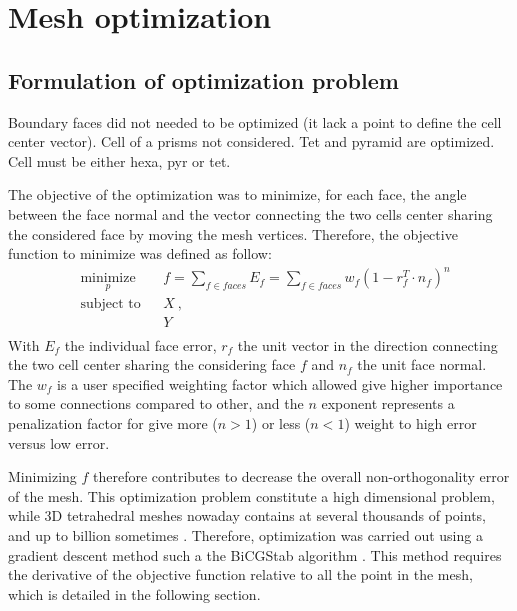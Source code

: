 \documentclass[11pt]{article}
\begin{document}
\section{Mesh optimization}


\subsection{Formulation of optimization problem}

Boundary faces did not needed to be optimized (it lack a point to define the cell center vector).
Cell of a prisms not considered. Tet and pyramid are optimized. Cell must be either hexa, pyr or tet.

The objective of the optimization was to minimize, for each face, the angle between the face normal and the vector connecting the two cells center sharing the considered face by moving the mesh vertices. 
Therefore, the objective function to minimize was defined as follow:
%
\begin{equation}
\begin{aligned}
& \underset{p}{\text{minimize}}
& & f = \sum_{f \in faces} E_f = \sum_{f \in faces} w_f \left( 1 - r_f^T \cdot n_f \right) ^n  \\
& \text{subject to}
& & 
X \: , \\
& & & Y \\
\end{aligned}
\label{eq:opt_problem}
\end{equation}
With $E_f$ the individual face error, $r_f$ the unit vector in the direction connecting the two cell center sharing the considering face $f$ and $n_f$ the unit face normal. 
The $w_f$ is a user specified weighting factor which allowed give higher importance to some connections compared to other, and the $n$ exponent represents a penalization factor for give more ($n>1$) or less ($n<1$) weight to high error versus low error. 

Minimizing $f$ therefore contributes to decrease the overall non-orthogonality error of the mesh.
This optimization problem constitute a high dimensional problem, while 3D tetrahedral meshes nowaday contains at several thousands of points, and up to billion sometimes \cite{neau_massively_2020}.
Therefore, optimization was carried out using a gradient descent method such a the BiCGStab algorithm \cite{}.
This method requires the derivative of the objective function relative to all the point in the mesh, which is detailed in the following section.
\end{document}
